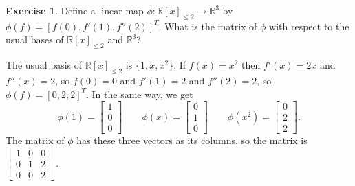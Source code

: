 \documentclass{amsart}
\newcommand{\R}         {{\mathbb{R}}}
\newcommand{\bbm}       {\left[\begin{matrix}}
\newcommand{\ebm}       {\end{matrix}\right]}
\newcommand{\bsm}       {\left[\begin{smallmatrix}}
\newcommand{\esm}       {\end{smallmatrix}\right]}
\renewcommand{\:}       {\colon}
\theoremstyle{definition}
\newtheorem{exercise}{Exercise}[section]
\renewenvironment{solution}{\SolutionAtEnd}{\endSolutionAtEnd}
\begin{document}
\begin{exercise}
 Define a linear map $\phi\:\R[x]_{\leq 2}\to\R^3$ by
 $\phi(f)=[f(0),f'(1),f''(2)]^T$.  What is the matrix of $\phi$ with
 respect to the usual bases of $\R[x]_{\leq 2}$ and $\R^3$?
\end{exercise}
\begin{solution}
 The usual basis of $\R[x]_{\leq 2}$ is $\{1,x,x^2\}$.  If
 $f(x)=x^2$ then $f'(x)=2x$ and $f''(x)=2$, so $f(0)=0$ and
 $f'(1)=2$ and $f''(2)=2$, so $\phi(f)=[0,2,2]^T$.  In the same
 way, we get
 \[
  \phi(1)   = \bsm 1\\0\\0\esm \hspace{2em}
  \phi(x)   = \bsm 0\\1\\0\esm \hspace{2em}
  \phi(x^2) = \bsm 0\\2\\2\esm.
 \]
 The matrix of $\phi$ has these three vectors as its columns, so
 the matrix is $\bbm 1&0&0\\ 0&1&2\\ 0&0&2\ebm$.
\end{solution}
\end{document}

